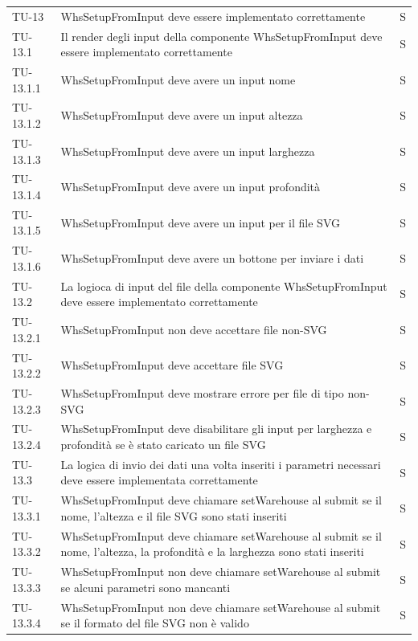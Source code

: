 \begin{xltabular}{0.9\textwidth}{X | p{0.6\textwidth} | p{0.1\textwidth} }
    TU-13 & WhsSetupFromInput deve essere implementato correttamente & S\\
    TU-13.1 & Il render degli input della componente WhsSetupFromInput deve essere implementato correttamente & S\\
    TU-13.1.1 & WhsSetupFromInput deve avere un input nome & S\\
    TU-13.1.2 & WhsSetupFromInput deve avere un input altezza & S\\
    TU-13.1.3 & WhsSetupFromInput deve avere un input larghezza & S\\
    TU-13.1.4 & WhsSetupFromInput deve avere un input profondità & S\\
    TU-13.1.5 & WhsSetupFromInput deve avere un input per il file SVG & S\\
    TU-13.1.6 & WhsSetupFromInput deve avere un bottone per inviare i dati & S\\
    TU-13.2 & La logioca di input del file della componente WhsSetupFromInput deve essere implementato correttamente & S\\
    TU-13.2.1 & WhsSetupFromInput non deve accettare file non-SVG & S\\
    TU-13.2.2 & WhsSetupFromInput deve accettare file SVG & S\\
    TU-13.2.3 & WhsSetupFromInput deve mostrare errore per file di tipo non-SVG & S\\
    TU-13.2.4 & WhsSetupFromInput deve disabilitare gli input per larghezza e profondità se è stato caricato un file SVG & S\\
    TU-13.3 & La logica di invio dei dati una volta inseriti i parametri necessari deve essere implementata correttamente & S\\
    TU-13.3.1 & WhsSetupFromInput deve chiamare setWarehouse al submit se il nome, l'altezza e il file SVG sono stati inseriti & S\\
    TU-13.3.2 & WhsSetupFromInput deve chiamare setWarehouse al submit se il nome, l'altezza, la profondità e la larghezza sono stati inseriti & S\\
    TU-13.3.3 & WhsSetupFromInput non deve chiamare setWarehouse al submit se alcuni parametri sono mancanti & S\\
    TU-13.3.4 & WhsSetupFromInput non deve chiamare setWarehouse al submit se il formato del file SVG non è valido & S\\


\end{xltabular}

